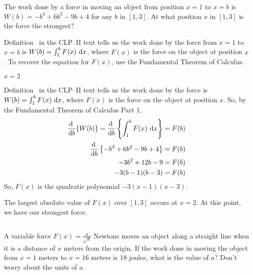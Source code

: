 \begin{Mquestion}
The work done by a force in moving an object from position $x = 1$ to $x = b$ is
$W(b) = -b^3+6b^2-9b+4$
for any $b$ in $[1,3]$. At what position $x$ in $[1,3]$ is the force the strongest?
\end{Mquestion}
\begin{hint}
Definition~ in the CLP--II text tells us the work done by the force from $x=1$ to $x=b$ is
$W(b) = \int_1^b F(x)~\mathrm{d}x$, where $F(x)$ is the force on the object at position $x$. To recover the equation for $F(x)$, use the Fundamental Theorem of Calculus.
\end{hint}
\begin{answer}
$x=2$
\end{answer}
\begin{solution}
Definition~ in the CLP--II text tells us the work done by the force is
$W(b) = \int_1^b F(x)~\mathrm{d}x$, where $F(x)$ is the force on the object at position $x$.
So, by the Fundamental Theorem of Calculus Part 1,
\begin{align*}
\diff{}{b}\{W(b)\} = \diff{}{b}\left\{\int_1^b F(x)~\dee{x}\right\} &= F(b)\\
\diff{}{b}\left\{-b^3+6b^2-9b+4\right\}&=F(b)\\
-3b^2+12b-9&=F(b)\\
-3(b-1)(b-3)&=F(b)
\end{align*}
So, $F(x)$ is the quadratic polynomial $-3(x-1)(x-3)$.
\begin{center}
\end{center}
The largest absolute value of $F(x)$ over $[1,3]$ occurs at $x=2$.  At this point, we have our strongest force.
\end{solution}


\subsection*{\Procedural}





\begin{question}[2014D]
A variable force $F(x) = \frac{a}{\sqrt{x}}$ Newtons moves an object
along a straight line when it is a distance of $x$ meters from the origin.
If the work done in moving the object from $x = 1$ meters to
$x = 16$ meters is $18$ joules, what is the value of $a$? Don't worry
about the units of $a$.
\end{question}


